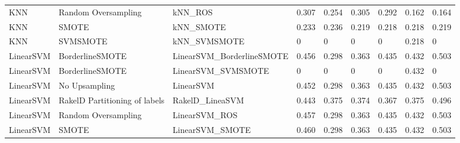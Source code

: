 \begin{tabular}{lllllllll}
                            KNN &           Random Oversampling &                                      kNN\_ROS & 0.307 &                     0.254 &                 0.305 &                  0.292 &                                   0.162 &    0.164 \\
                            KNN &                         SMOTE &                                    kNN\_SMOTE & 0.233 &                     0.236 &                 0.219 &                  0.218 &                                   0.218 &    0.219 \\
                            KNN &                      SVMSMOTE &                                 kNN\_SVMSMOTE &     0 &                         0 &                     0 &                      0 &                                   0.218 &        0 \\
                      LinearSVM &               BorderlineSMOTE &                    LinearSVM\_BorderlineSMOTE & 0.456 &                     0.298 &                 0.363 &                  0.435 &                                   0.432 &    0.503 \\
                      LinearSVM &               BorderlineSMOTE &                           LinearSVM\_SVMSMOTE &     0 &                         0 &                     0 &                      0 &                                   0.432 &        0 \\
                      LinearSVM &                 No Upsampling &                                    LinearSVM & 0.452 &                     0.298 &                 0.363 &                  0.435 &                                   0.432 &    0.503 \\
                      LinearSVM & RakelD Partitioning of labels &                              RakelD\_LineaSVM & 0.443 &                     0.375 &                 0.374 &                  0.367 &                                   0.375 &    0.496 \\
                      LinearSVM &           Random Oversampling &                                LinearSVM\_ROS & 0.457 &                     0.298 &                 0.363 &                  0.435 &                                   0.432 &    0.503 \\
                      LinearSVM &                         SMOTE &                              LinearSVM\_SMOTE & 0.460 &                     0.298 &                 0.363 &                  0.435 &                                   0.432 &    0.503 \\

\end{tabular}
